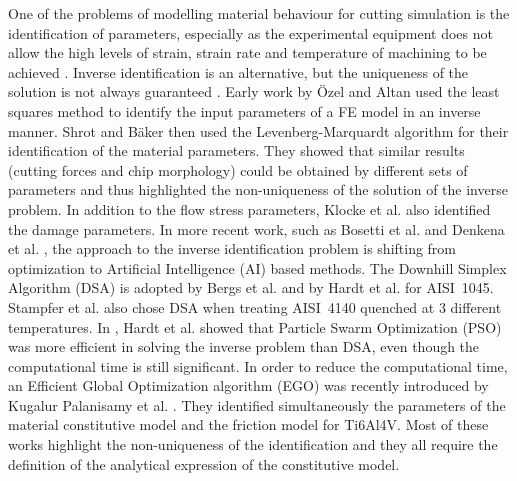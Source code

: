 \documentclass[preprint,12pt,times]{elsarticle}
\begin{document}
One of the problems of modelling material behaviour for cutting simulation is the identification of parameters, especially as the experimental equipment does not allow the high levels of strain, strain rate and temperature of machining to be achieved \cite{melkote_Advances_2017}. Inverse identification is an alternative, but the uniqueness of the solution is not always guaranteed \cite{arrazola_Recent_2013, melkote_Advances_2017}. Early work by Özel and Altan \cite{ozel_Determination_2000} used the least squares method to identify the input parameters of a FE model in an inverse manner. Shrot and Bäker \cite{shrot_Determination_2012} then used the Levenberg-Marquardt algorithm for their identification of the material parameters. They showed that similar results (cutting forces and chip morphology) could be obtained by different sets of parameters and thus highlighted the non-uniqueness of the solution of the inverse problem. In addition to the flow stress parameters, Klocke et al. \cite{klocke_Orthogonal_2013} also identified the damage parameters. In more recent work, such as Bosetti et al. \cite{bosetti_Identification_2013} and Denkena et al. \cite{denkena_Inverse_2015}, the approach to the inverse identification problem is shifting from optimization to Artificial Intelligence (AI) based methods. The Downhill Simplex Algorithm (DSA) is adopted by Bergs et al. \cite{bergs_Determination_2020} and by Hardt et al. \cite{hardt_Investigations_2021} for AISI~1045. Stampfer et al. \cite{stampfer_Material_2021} also chose DSA when treating AISI~4140 quenched at 3 different temperatures. In \cite{hardt_Application_2021}, Hardt et al. showed that Particle Swarm Optimization (PSO) was more efficient in solving the inverse problem than DSA, even though the computational time is still significant. In order to reduce the computational time, an Efficient Global Optimization algorithm (EGO) was recently introduced by Kugalur Palanisamy et al. \cite{kugalurpalanisamy_Identification_2022}. They identified simultaneously the parameters of the material constitutive model and the friction model for Ti6Al4V. Most of these works highlight the non-uniqueness of the identification and they all require the definition of the analytical expression of the constitutive model.
\end{document}
